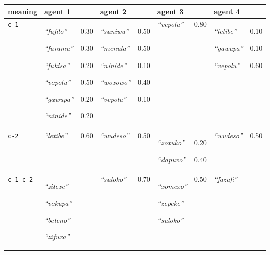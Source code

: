 
{\renewcommand{\arraystretch}{1.5}
\begin{tabular}{@{}p{1.2cm}|p{1.6cm}@{}p{0.8cm}@{}|p{1.6cm}@{}p{0.8cm}@{}|p{1.6cm}@{}p{0.8cm}@{}|p{1.6cm}@{}p{0.8cm}@{}}
meaning & agent 1 &  & agent 2 &  & agent 3 &  & agent 4 & \\
\hline
\texttt{c-1}&\textit{``fufilo''}


\textit{``furamu''}


\textit{``fukisa''}


\textit{``vepolu''}


\textit{``gawupa''}


\textit{``ninide''}
&0.30

0.30

0.20

0.50

0.20

0.20&\textit{``suniwu''}


\textit{``menula''}


\textit{``ninide''}


\textit{``woxowo''}


\textit{``vepolu''}
&0.50

0.50

0.10

0.40

0.10&\textit{``vepolu''}
&0.80&\textit{``letibe''}


\textit{``gawupa''}


\textit{``vepolu''}
&0.10

0.10

0.60\\
\hline
\texttt{c-2}&\textit{``letibe''}
&0.60&\textit{``wudeso''}
&0.50&\textit{``zoxuko''}


\textit{``dapuvo''}
&0.20

0.40&\textit{``wudeso''}
&0.50\\
\hline
\texttt{c-1 c-2}&\textit{``zilexe''}


\textit{``vekupa''}


\textit{``beleno''}


\textit{``zifuxa''}
&&\textit{``suloko''}
&0.70&\textit{``xomexo''}


\textit{``zepeke''}


\textit{``suloko''}
&0.50&\textit{``fazufi''}
&
\end{tabular}}
